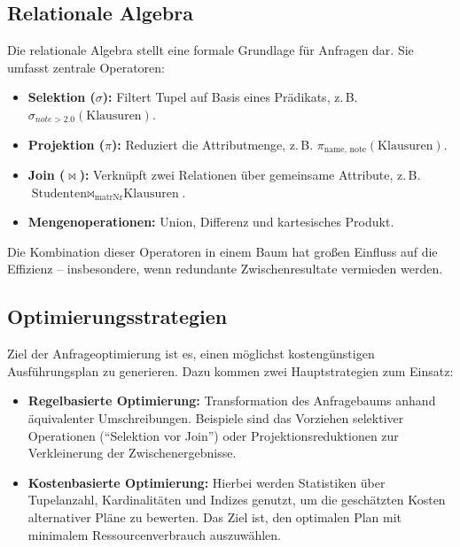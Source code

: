 \documentclass[12pt]{article}
\begin{document}
\subsection{Relationale Algebra}

Die relationale Algebra stellt eine formale Grundlage für Anfragen dar. Sie umfasst zentrale Operatoren:

\begin{itemize}
    \item \textbf{Selektion ($\sigma$):} Filtert Tupel auf Basis eines Prädikats, z.\,B. $\sigma_{note > 2.0}(\text{Klausuren})$.
    \item \textbf{Projektion ($\pi$):} Reduziert die Attributmenge, z.\,B. $\pi_{\text{name, note}}(\text{Klausuren})$.
    \item \textbf{Join ($\bowtie$):} Verknüpft zwei Relationen über gemeinsame Attribute, z.\,B. $\text{Studenten} \bowtie_{\text{matrNr}} \text{Klausuren}$.
    \item \textbf{Mengenoperationen:} Union, Differenz und kartesisches Produkt.
\end{itemize}

Die Kombination dieser Operatoren in einem Baum hat großen Einfluss auf die Effizienz – insbesondere, wenn redundante Zwischenresultate vermieden werden.

\subsection{Optimierungsstrategien}

Ziel der Anfrageoptimierung ist es, einen möglichst kostengünstigen Ausführungsplan zu generieren. Dazu kommen zwei Hauptstrategien zum Einsatz:

\begin{itemize}
    \item \textbf{Regelbasierte Optimierung:} Transformation des Anfragebaums anhand äquivalenter Umschreibungen. Beispiele sind das Vorziehen selektiver Operationen (``Selektion vor Join'') oder Projektionsreduktionen zur Verkleinerung der Zwischenergebnisse.
    
    \item \textbf{Kostenbasierte Optimierung:} Hierbei werden Statistiken über Tupelanzahl, Kardinalitäten und Indizes genutzt, um die geschätzten Kosten alternativer Pläne zu bewerten. Das Ziel ist, den optimalen Plan mit minimalem Ressourcenverbrauch auszuwählen.
\end{itemize}
\end{document}
